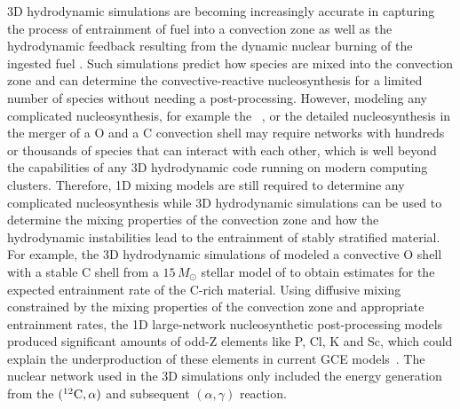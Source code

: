 \documentclass[fleqn,usenatbib]{mnras}
\begin{document}
3D hydrodynamic simulations are becoming increasingly accurate in
capturing the process of entrainment of fuel into a convection zone
\citep{meakin:07b,Mocak:2011jk,Woodward:2013uf} as well as the
hydrodynamic feedback resulting from the dynamic nuclear burning of
the ingested fuel
\citep{meakin:06a,Herwig:2014cx,Muller:2016kta,Yoshida:2019be,Andrassy:19,Yadav:2020gh}. Such
simulations predict how species are mixed into the convection zone and
can determine the convective-reactive nucleosynthesis for a limited
number of species without needing a post-processing.  However,
modeling any complicated nucleosynthesis, for example the
\iprn\ \citep{herwig:11}, or the detailed nucleosynthesis in the
merger of a O and a C convection shell \citep{Ritter2018} may require
networks with hundreds or thousands of species that can interact with
each other, which is well beyond the capabilities of any 3D
hydrodynamic code running on modern computing clusters. Therefore, 1D
mixing models are still required to determine any complicated
nucleosynthesis while 3D hydrodynamic simulations can be used to
determine the mixing properties of the convection zone and how the
hydrodynamic instabilities lead to the entrainment of stably
stratified material. For example, the 3D hydrodynamic simulations of
\citet{Ritter2018} modeled a convective O shell with a stable C shell
from a $15\,M_{\odot}$ stellar model of \citet{RitterSE} to obtain
estimates for the expected entrainment rate of the C-rich
material. Using diffusive mixing constrained by the mixing properties
of the convection zone and appropriate entrainment rates, the 1D
large-network nucleosynthetic post-processing models produced
significant amounts of odd-Z elements like P, Cl, K and Sc, which
could explain the underproduction of these elements in current GCE
models~\citep{Ritter2018}.  The nuclear network used in the 3D
simulations only included the energy generation from the
$(\mathrm{^{12}C},\alpha)$ and subsequent
$(\alpha,\gamma)$ reaction.
\end{document}

